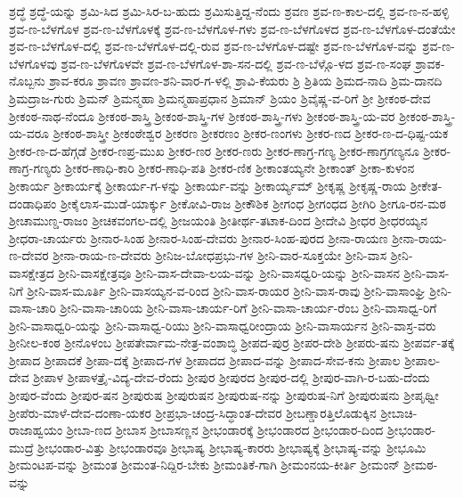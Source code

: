 ಶ್ರದ್ಧೆ
ಶ್ರದ್ಧೆ-ಯನ್ನು
ಶ್ರಮಿ-ಸಿದ
ಶ್ರಮಿ-ಸಿರ-ಬ-ಹುದು
ಶ್ರಮಿಸುತ್ತಿದ್ದ-ನೆಂದು
ಶ್ರವಣ
ಶ್ರವ-ಣ-ಕಾಲ-ದಲ್ಲಿ
ಶ್ರವ-ಣ-ನ-ಹಳ್ಳಿ
ಶ್ರವ-ಣ-ಬೆಳಗೊಳ
ಶ್ರವ-ಣ-ಬೆಳಗೊಳಕ್ಕೆ
ಶ್ರವ-ಣ-ಬೆಳಗೊಳ-ಗಳು
ಶ್ರವ-ಣ-ಬೆಳಗೊಳದ
ಶ್ರವ-ಣ-ಬೆಳಗೊಳ-ದಂತೆಯೇ
ಶ್ರವ-ಣ-ಬೆಳಗೊಳ-ದಲ್ಲಿ
ಶ್ರವ-ಣ-ಬೆಳಗೊಳ-ದಲ್ಲಿ-ರುವ
ಶ್ರವ-ಣ-ಬೆಳಗೊಳ-ದಷ್ಟೇ
ಶ್ರವ-ಣ-ಬೆಳಗೊಳ-ವನ್ನು
ಶ್ರವ-ಣ-ಬೆಳಗೊಳವು
ಶ್ರವ-ಣ-ಬೆಳಗೊಳವೇ
ಶ್ರವ-ಣ-ಬೆಳಗೊಳ-ಶಾ-ಸನ-ದಲ್ಲಿ
ಶ್ರವ-ಣ-ಬೆಳ್ಗೊ-ಳದ
ಶ್ರವ-ಣ-ಸಂಘ
ಶ್ರಾವಕ-ನೊಬ್ಬನು
ಶ್ರಾವ-ಕರೂ
ಶ್ರಾವಣ
ಶ್ರಾವಣ-ಶನಿ-ವಾರ-ಗ-ಳಲ್ಲಿ
ಶ್ರಾವಿ-ಕೆಯರು
ಶ್ರಿ
ಶ್ರಿತಿಯ
ಶ್ರಿಮದ-ನಾದಿ
ಶ್ರಿಮ-ದಾನದಿ
ಶ್ರಿಮದ್ರಾಜ-ಗುರು
ಶ್ರಿಮನ್
ಶ್ರಿಮನ್ಮಹಾ
ಶ್ರಿಮನ್ಮಹಾಪ್ರಧಾನ
ಶ್ರಿಮಾನ್
ಶ್ರಿಯಂ
ಶ್ರಿವೈಷ್ಣ-ವ-ರಿಗೆ
ಶ್ರೀ
ಶ್ರೀಕಂಠ-ದೇವ
ಶ್ರೀಕಂಠ-ನಾಥ-ನೆಂದೂ
ಶ್ರೀಕಂಠ-ಶಾಸ್ತ್ರಿ
ಶ್ರೀಕಂಠ-ಶಾಸ್ತ್ರಿ-ಗಳ
ಶ್ರೀಕಂಠ-ಶಾಸ್ತ್ರಿ-ಗಳು
ಶ್ರೀಕಂಠ-ಶಾಸ್ತ್ರಿ-ಯ-ವರ
ಶ್ರೀಕಂಠ-ಶಾಸ್ತ್ರಿ-ಯ-ವರೂ
ಶ್ರೀಕಂಠ-ಶಾಸ್ತ್ರೀ
ಶ್ರೀಕಂಠೇಶ್ವರ
ಶ್ರೀಕರಣ
ಶ್ರೀಕರಣಂ
ಶ್ರೀಕರ-ಣಂಗಳು
ಶ್ರೀಕರ-ಣದ
ಶ್ರೀಕರ-ಣ-ದ-ಧಿಷ್ಟ-ಯಕ
ಶ್ರೀಕರ-ಣ-ದ-ಹೆಗ್ಗಡೆ
ಶ್ರೀಕರ-ಣಪ್ರ-ಮುಖ
ಶ್ರೀಕರ-ಣರ
ಶ್ರೀಕರ-ಣರು
ಶ್ರೀಕರ-ಣಾಗ್ರ-ಗಣ್ಯ
ಶ್ರೀಕರ-ಣಾಗ್ರಗಣ್ಯನೂ
ಶ್ರೀಕರ-ಣಾಗ್ರ-ಗಣ್ಯರು
ಶ್ರೀಕರ-ಣಾಧಿ-ಕಾರಿ
ಶ್ರೀಕರ-ಣಾಧಿ-ಪತಿ
ಶ್ರೀಕರ-ಣಿಕ
ಶ್ರೀಕಾಂತಯ್ಯನೇ
ಶ್ರೀಕಾಂತ್
ಶ್ರೀಕಾ-ಕುಳಂನ
ಶ್ರೀಕಾರ್ಯ
ಶ್ರೀಕಾರ್ಯಕ್ಕೆ
ಶ್ರೀಕಾರ್ಯ-ಗ-ಳನ್ನು
ಶ್ರೀಕಾರ್ಯ-ವನ್ನು
ಶ್ರೀಕಾರ್ಯ್ಯಮ್
ಶ್ರೀಕೃಷ್ಣ
ಶ್ರೀಕೃಷ್ಣ-ರಾಯ
ಶ್ರೀಕೇತ-ದಂಡಾಧಿಪಂ
ಶ್ರೀಕೈಲಾಸ-ಮುಡೆ-ಯಾರ್ಕ್ಕು
ಶ್ರೀಕೋವಿ-ರಾಜ
ಶ್ರೀಕೌಶಿಕ
ಶ್ರೀಗಂಧ
ಶ್ರೀಗಂಧದ
ಶ್ರೀಗಿರಿ
ಶ್ರೀಗೂ-ರನ-ಮಠ
ಶ್ರೀಚಾಮುಣ್ಡ-ರಾಜಂ
ಶ್ರೀಚಿಕವಂಗಲ-ದಲ್ಲಿ
ಶ್ರೀಜಯಂತಿ
ಶ್ರೀತೀರ್ಥ-ತಟಾಕ-ದಿಂದ
ಶ್ರೀದೇವಿ
ಶ್ರೀಧರ
ಶ್ರೀಧರಯ್ಯನ
ಶ್ರೀಧರಾ-ಚಾರ್ಯರು
ಶ್ರೀನಾರ-ಸಿಂಹ
ಶ್ರೀನಾರ-ಸಿಂಹ-ದೇವರು
ಶ್ರೀನಾರ-ಸಿಂಹ-ಪುರದ
ಶ್ರೀನಾ-ರಾಯಣ
ಶ್ರೀನಾ-ರಾಯ-ಣ-ದೇವರ
ಶ್ರೀನಾ-ರಾಯ-ಣ-ದೇವರು
ಶ್ರೀನಿಜ-ಬೋಧಪ್ರಭು-ಗಳ
ಶ್ರೀನಿ-ವಾರ-ಸೂಕ್ತಯೇ
ಶ್ರೀನಿ-ವಾಸ
ಶ್ರೀನಿ-ವಾಸಕ್ಷೇತ್ರದ
ಶ್ರೀನಿ-ವಾಸಕ್ಷೇತ್ರವೂ
ಶ್ರೀನಿ-ವಾಸ-ದೇವಾ-ಲಯ-ವನ್ನು
ಶ್ರೀನಿ-ವಾಸಧ್ವರಿ-ಯನ್ನು
ಶ್ರೀನಿ-ವಾಸನ
ಶ್ರೀನಿ-ವಾಸ-ನಿಗೆ
ಶ್ರೀನಿ-ವಾಸ-ಮೂರ್ತಿ
ಶ್ರೀನಿ-ವಾಸಯ್ಯನ-ವ-ರಿಂದ
ಶ್ರೀನಿ-ವಾಸ-ರಾಯರ
ಶ್ರೀನಿ-ವಾಸ-ರಾವು
ಶ್ರೀನಿ-ವಾಸಾಂಘ್ರಿ
ಶ್ರೀನಿ-ವಾಸಾ-ಚಾರಿ
ಶ್ರೀನಿ-ವಾಸಾ-ಚಾರಿಯ
ಶ್ರೀನಿ-ವಾಸಾ-ಚಾರ್ಯ-ರಿಗೆ
ಶ್ರೀನಿ-ವಾಸಾ-ಚಾರ್ಯ-ರೆಂಬ
ಶ್ರೀನಿ-ವಾಸಾಧ್ವ-ರಿಗೆ
ಶ್ರೀನಿ-ವಾಸಾಧ್ವರಿ-ಯನ್ನು
ಶ್ರೀನಿ-ವಾಸಾಧ್ವ-ರಿಯು
ಶ್ರೀನಿ-ವಾಸಾಧ್ವರೀಂದ್ರಾಯ
ಶ್ರೀನಿ-ವಾಸಾರ್ಯನ
ಶ್ರೀನಿ-ವಾಸ್ರ-ವರು
ಶ್ರೀನೀಲ-ಕಂಠ
ಶ್ರೀನೊಳಂಬ
ಶ್ರೀಪತೇರ್ವಾಮ-ನೇತ್ರ-ವಂಶಾಬ್ಧಿ
ಶ್ರೀಪದ-ಪುರ್ರ
ಶ್ರೀಪರ-ದೇಶಿ
ಶ್ರೀಪರು-ಷನು
ಶ್ರೀಪರ್ವ-ತಕ್ಕೆ
ಶ್ರೀಪಾದ
ಶ್ರೀಪಾದಕೆ
ಶ್ರೀಪಾ-ದಕ್ಕೆ
ಶ್ರೀಪಾದ-ಗಳ
ಶ್ರೀಪಾದದ
ಶ್ರೀಪಾದ-ವನ್ನು
ಶ್ರೀಪಾದ-ಸೇವ-ಕನು
ಶ್ರೀಪಾಲ
ಶ್ರೀಪಾಲ-ದೇವ
ಶ್ರೀಪಾಳ
ಶ್ರೀಪಾಳತ್ರೈ-ವಿದ್ಯ-ದೇವ-ರೆಂದು
ಶ್ರೀಪುರ
ಶ್ರೀಪುರದ
ಶ್ರೀಪುರ-ದಲ್ಲಿ
ಶ್ರೀಪುರ-ವಾಗಿ-ರ-ಬಹು-ದೆಂದು
ಶ್ರೀಪುರ-ವೆಂದು
ಶ್ರೀಪುರ-ಷನ
ಶ್ರೀಪುರುಷ
ಶ್ರೀಪುರುಷನ
ಶ್ರೀಪುರುಷ-ನನ್ನು
ಶ್ರೀಪುರುಷ-ನಿಗೆ
ಶ್ರೀಪುರುಷನು
ಶ್ರೀಪೃಥ್ವೀ
ಶ್ರೀಪೆರು-ಮಾಳೆ-ದೇವ-ದಂಣಾ-ಯಕರ
ಶ್ರೀಪ್ರಭಾ-ಚಂದ್ರ-ಸಿದ್ಧಾಂತ-ದೇವರ
ಶ್ರೀಬಣ್ಡಾರತ್ತಿಲೊಡುಕ್ಕಿನ
ಶ್ರೀಬಾಚಿ-ರಾಜಾಹ್ವಯಂ
ಶ್ರೀಬಾ-ಣದ
ಶ್ರೀಬಾಸ
ಶ್ರೀಬಾಸಣ್ಣನ
ಶ್ರೀಭಂಡಾರಕ್ಕೆ
ಶ್ರೀಭಂಡಾರದ
ಶ್ರೀಭಂಡಾರ-ದಿಂದ
ಶ್ರೀಭಂಡಾರ-ಮುದ್ರೆ
ಶ್ರೀಭಂಡಾರ-ವಿತ್ತು
ಶ್ರೀಭಂಡಾರವೂ
ಶ್ರೀಭಾಷ್ಯ
ಶ್ರೀಭಾಷ್ಯ-ಕಾರರು
ಶ್ರೀಭಾಷ್ಯಕ್ಕೆ
ಶ್ರೀಭಾಷ್ಯ-ವನ್ನು
ಶ್ರೀಭೂಮಿ
ಶ್ರೀಮಂಟಪ-ವನ್ನು
ಶ್ರೀಮಂತ
ಶ್ರೀಮಂತ-ನಿದ್ದಿರ-ಬೇಕು
ಶ್ರೀಮಂತಿಕೆ-ಗಾಗಿ
ಶ್ರೀಮಂನಯ-ಕೀರ್ತಿ
ಶ್ರೀಮಂನ್
ಶ್ರೀಮಠ-ವನ್ನು
